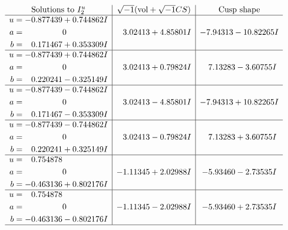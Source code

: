 \documentclass[1p]{elsarticle_modified}
\theoremstyle{definition}
\newcommand{\I}{\sqrt{-1}}
\begin{document}
$$\begin{array}{c|c|c}  
\text{Solutions to }I^u_{2}& \I (\text{vol} + \sqrt{-1}CS) & \text{Cusp shape}\\
 \hline 
\begin{aligned}
u &= -0.877439 + 0.744862 I \\
a &= \phantom{-0.000000 } 0 \\
b &= \phantom{-}0.171467 + 0.353309 I\end{aligned}
 & \phantom{-}3.02413 + 4.85801 I & -7.94313 - 10.82265 I \\ \hline\begin{aligned}
u &= -0.877439 + 0.744862 I \\
a &= \phantom{-0.000000 } 0 \\
b &= \phantom{-}0.220241 - 0.325149 I\end{aligned}
 & \phantom{-}3.02413 + 0.79824 I & \phantom{-}7.13283 - 3.60755 I \\ \hline\begin{aligned}
u &= -0.877439 - 0.744862 I \\
a &= \phantom{-0.000000 } 0 \\
b &= \phantom{-}0.171467 - 0.353309 I\end{aligned}
 & \phantom{-}3.02413 - 4.85801 I & -7.94313 + 10.82265 I \\ \hline\begin{aligned}
u &= -0.877439 - 0.744862 I \\
a &= \phantom{-0.000000 } 0 \\
b &= \phantom{-}0.220241 + 0.325149 I\end{aligned}
 & \phantom{-}3.02413 - 0.79824 I & \phantom{-}7.13283 + 3.60755 I \\ \hline\begin{aligned}
u &= \phantom{-}0.754878\phantom{ +0.000000I} \\
a &= \phantom{-0.000000 } 0 \\
b &= -0.463136 + 0.802176 I\end{aligned}
 & -1.11345 + 2.02988 I & -5.93460 - 2.73535 I \\ \hline\begin{aligned}
u &= \phantom{-}0.754878\phantom{ +0.000000I} \\
a &= \phantom{-0.000000 } 0 \\
b &= -0.463136 - 0.802176 I\end{aligned}
 & -1.11345 - 2.02988 I & -5.93460 + 2.73535 I\\
 \hline 
 \end{array}$$\newpage
\end{document}
